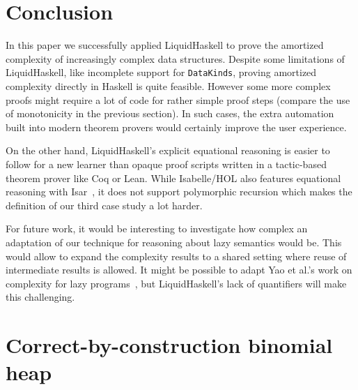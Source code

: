 \documentclass[sigplan,screen,review,anonymous]{acmart}
\begin{document}
\section{Conclusion}\label{sec:conclusion}

In this paper we successfully applied LiquidHaskell to prove the amortized complexity of increasingly complex data structures. Despite some limitations of LiquidHaskell, like incomplete support for \texttt{DataKinds}, proving amortized complexity directly in Haskell is quite feasible. However some more complex proofs might require a lot of code for rather simple proof steps (compare the use of monotonicity in the previous section). In such cases, the extra automation built into modern theorem provers would certainly improve the user experience.

On the other hand, LiquidHaskell's explicit equational reasoning is easier to follow for a new learner than opaque proof scripts written in a tactic-based theorem prover like Coq or Lean. While Isabelle/HOL also features equational reasoning with Isar~\cite{isar}, it does not support polymorphic recursion which makes the definition of our third case study a lot harder.

For future work, it would be interesting to investigate how complex an adaptation of our technique for reasoning about lazy semantics would be. This would allow to expand the complexity results to a shared setting where reuse of intermediate results is allowed. It might be possible to adapt Yao et al.'s work on complexity for lazy programs~\cite{forking_paths}, but LiquidHaskell's lack of quantifiers will make this challenging.





\appendix

\section{Correct-by-construction binomial heap}\label{app:datakinds}
\end{document}
